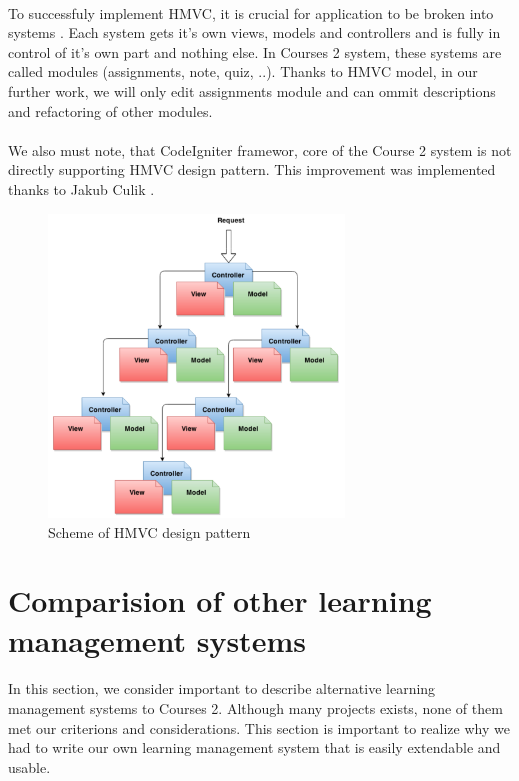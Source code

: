 \paragraph{}
To successfuly implement HMVC, it is crucial for application to be broken into systems \cite{hmvc}. Each system gets it's own views, models and controllers and is fully in control of it's own part and nothing else. In Courses 2 system, these systems are called modules (assignments, note, quiz, ..). Thanks to HMVC model, in our further work, we will only edit assignments module and can ommit descriptions and refactoring of other modules.

\paragraph{}
We also must note, that CodeIgniter framewor, core of the Course 2 system is not directly supporting HMVC design pattern. This improvement was implemented thanks to Jakub Culik \cite{culik}.

\begin{figure}[t]
    \centering
    \includegraphics[width=0.7\textwidth]{courses/hmvc.png}
    \caption{Scheme of HMVC design pattern}
    \label{fig:awesome_image}
\end{figure}


\section{Comparision of other learning management systems}
\paragraph{}
In this section, we consider important to describe alternative learning management systems to Courses 2. Although many projects exists, none of them met our criterions and considerations. This section is important to realize why we had to write our own learning management system that is easily extendable and usable.

